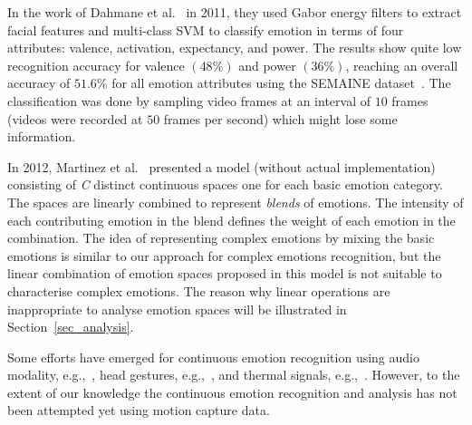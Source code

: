 \documentclass[10pt,journal,cspaper,compsoc]{IEEEtran}
\begin{document}

In the work of Dahmane et al.~\cite{dahmane2011continuous} in 2011, they used Gabor energy filters to extract facial features and multi-class SVM to classify emotion in terms of four attributes: valence, activation, expectancy, and power. The results show quite low recognition accuracy for valence $(48\%)$ and power $(36\%)$, reaching an overall accuracy of $51.6\%$ for all emotion attributes using the SEMAINE dataset~\cite{mckeown2010semaine}. The classification was done by sampling video frames at an interval of $10$ frames (videos were recorded at $50$ frames per second) which might lose some information.

In 2012, Martinez et al.~\cite{martinez2012model} presented a model (without actual implementation) consisting of \textit{C} distinct continuous spaces one for each basic emotion category. The spaces are linearly combined to represent \textit{blends} of emotions. The intensity of each contributing emotion in the blend defines the weight of each emotion in the combination. The idea of representing complex emotions by mixing the basic emotions is similar to our approach for complex emotions recognition, but the linear combination of emotion spaces proposed in this model is not suitable to characterise complex emotions. The reason why linear operations are inappropriate to analyse emotion spaces will be illustrated in Section~\ref{sec_analysis}.

Some efforts have emerged for continuous emotion recognition using audio modality, e.g.,~\cite{grimm2008vera, lee2009modeling, wollmer2008abandoning}, head gestures, e.g.,~\cite{gunes2010dimensional}, and thermal signals, e.g.,~\cite{merla2007thermal, nhan2010classifying}. However, to the extent of our knowledge the continuous emotion recognition and analysis has not been attempted yet using motion capture data.
\end{document}
